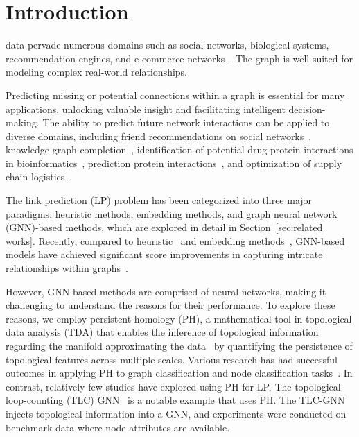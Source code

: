\section{Introduction}

 data
pervade numerous domains such as social networks, biological systems, recommendation engines, and e-commerce networks~\cite{zhang2020deep, wu2020comprehensive}.
The graph is well-suited for modeling complex real-world relationships.

Predicting missing or potential connections within a graph is essential for many applications, unlocking valuable insight and facilitating intelligent decision-making. 
The ability to predict future network interactions can be applied to diverse domains, including friend recommendations on social networks~\cite{adamic2003friends, yao2016link, fire2011link}, knowledge graph completion~\cite{kazemi2018simple, nayyeri2021link}, identification of potential drug-protein interactions in bioinformatics~\cite{stanfield2017drug, nasiri2021novel}, prediction protein interactions~\cite{lei2013novel, kovacs2019network, nasiri2021novel}, and optimization of supply chain logistics~\cite{brockmann2022supply, brintrup2018predicting}.

The link prediction (LP) problem has been categorized into three major paradigms: heuristic methods, embedding methods, and graph neural network (GNN)-based methods, which are explored in detail in Section~\ref{sec:related works}.
Recently, compared to heuristic~\cite{adamic2003friends, lu2011link, barabasi1999emergence, zhou2009predicting, brin2012reprint, jeh2002simrank} and embedding methods~\cite{koren2009matrix, perozzi2014deepwalk, grover2016node2vec, tang2015line}, GNN-based models have achieved significant score improvements in capturing intricate relationships within graphs~\cite{kipf2016variational, zhang2018link, yun2021neo, mavromatis2020graph, yan2021link, pan2021neural}. 

However, GNN-based methods are comprised of neural networks, making it challenging to understand the reasons for their performance.
To explore these reasons, we employ persistent homology (PH), a mathematical tool in topological data analysis (TDA) that enables the inference of topological information regarding the manifold approximating the data~\cite{huber2021persistent, dey2022computational} by quantifying the persistence of topological features across multiple scales.
Various research has had successful outcomes in applying PH to graph classification and node classification tasks~\cite{horn2021topological, ye2023treph, carriere2020perslay, taiwo2024explaining, wen2024tensor, immonen2024going, ying2024boosting, zhao2019learning, chen2021topological, zhao2020persistence}.
In contrast, relatively few studies have explored using PH for LP.
The topological loop-counting (TLC) GNN~\cite{yan2021link} is a notable example that uses PH.
The TLC-GNN injects topological information into a GNN, and experiments were conducted on benchmark data where node attributes are available.


